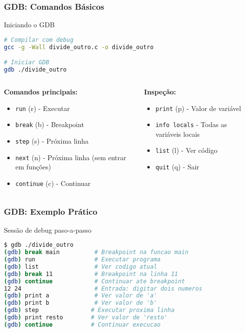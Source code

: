 \documentclass[aspectratio=169]{beamer}
\begin{document}
\begin{frame}[fragile]
\frametitle{GDB: Comandos Básicos}
\begin{block}{Iniciando o GDB}
\begin{lstlisting}[language=bash]
# Compilar com debug
gcc -g -Wall divide_outro.c -o divide_outro

# Iniciar GDB
gdb ./divide_outro
\end{lstlisting}
\end{block}

\begin{columns}
\begin{column}{0.5\textwidth}
\textbf{Comandos principais:}
\begin{itemize}
    \item \texttt{run} (r) - Executar
    \item \texttt{break} (b) - Breakpoint
    \item \texttt{step} (s) - Próxima linha
    \item \texttt{next} (n) - Próxima linha (sem entrar em funções)
    \item \texttt{continue} (c) - Continuar
\end{itemize}
\end{column}
\begin{column}{0.5\textwidth}
\textbf{Inspeção:}
\begin{itemize}
    \item \texttt{print} (p) - Valor de variável
    \item \texttt{info locals} - Todas as variáveis locais
    \item \texttt{list} (l) - Ver código
    \item \texttt{quit} (q) - Sair
\end{itemize}
\end{column}
\end{columns}
\end{frame}

\begin{frame}[fragile]
\frametitle{GDB: Exemplo Prático}
\begin{block}{Sessão de debug paso-a-passo}
\begin{lstlisting}[language=bash]
$ gdb ./divide_outro
(gdb) break main          # Breakpoint na funcao main
(gdb) run                 # Executar programa
(gdb) list                # Ver codigo atual
(gdb) break 11            # Breakpoint na linha 11
(gdb) continue            # Continuar ate breakpoint
12 24                     # Entrada: digitar dois numeros
(gdb) print a             # Ver valor de 'a'
(gdb) print b             # Ver valor de 'b'
(gdb) step               # Executar proxima linha
(gdb) print resto        # Ver valor de 'resto'
(gdb) continue           # Continuar execucao
\end{lstlisting}
\end{block}
\end{frame}
\end{document}
